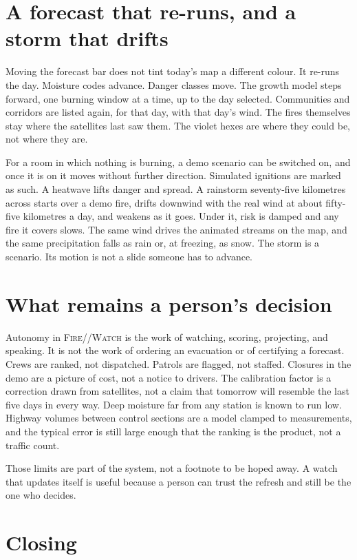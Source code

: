 \documentclass[11pt,a4paper]{article}
\newcommand{\fw}{\textsc{Fire}//\textsc{Watch}}
\begin{document}
\section{A forecast that re-runs, and a storm that drifts}

Moving the forecast bar does not tint today's map a different colour. It re-runs the day. Moisture codes advance. Danger classes move. The growth model steps forward, one burning window at a time, up to the day selected. Communities and corridors are listed again, for that day, with that day's wind. The fires themselves stay where the satellites last saw them. The violet hexes are where they could be, not where they are.

For a room in which nothing is burning, a demo scenario can be switched on, and once it is on it moves without further direction. Simulated ignitions are marked as such. A heatwave lifts danger and spread. A rainstorm seventy-five kilometres across starts over a demo fire, drifts downwind with the real wind at about fifty-five kilometres a day, and weakens as it goes. Under it, risk is damped and any fire it covers slows. The same wind drives the animated streams on the map, and the same precipitation falls as rain or, at freezing, as snow. The storm is a scenario. Its motion is not a slide someone has to advance.

\section{What remains a person's decision}

Autonomy in \fw{} is the work of watching, scoring, projecting, and speaking. It is not the work of ordering an evacuation or of certifying a forecast. Crews are ranked, not dispatched. Patrols are flagged, not staffed. Closures in the demo are a picture of cost, not a notice to drivers. The calibration factor is a correction drawn from satellites, not a claim that tomorrow will resemble the last five days in every way. Deep moisture far from any station is known to run low. Highway volumes between control sections are a model clamped to measurements, and the typical error is still large enough that the ranking is the product, not a traffic count.

Those limits are part of the system, not a footnote to be hoped away. A watch that updates itself is useful because a person can trust the refresh and still be the one who decides.

\section{Closing}
\end{document}
